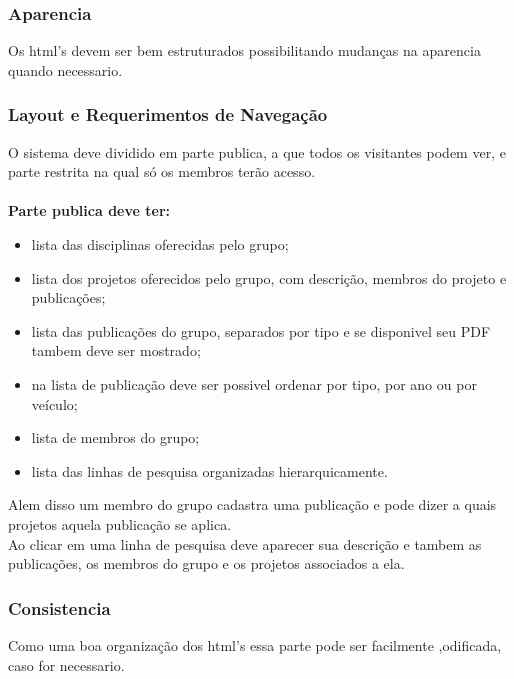 \documentclass[11pt, a4paper]{article}
\begin{document}
			\subsubsection{Aparencia}
				Os html's devem ser bem estruturados possibilitando mudanças 
				na aparencia quando necessario.
				
			\subsubsection{Layout e Requerimentos de Navegação}
				O sistema deve dividido em parte publica, a que todos os 
				visitantes podem ver, e parte restrita na qual só os membros 
				terão acesso.\\
				\\
				\noindent \textbf{Parte publica deve ter:}
				\begin{itemize}
					\item lista das disciplinas oferecidas pelo grupo;
					\item lista dos projetos oferecidos pelo grupo, com 
					descrição, membros do projeto e publicações;
					\item lista das publicações do grupo, separados por tipo e 
					se disponivel seu PDF tambem deve ser mostrado;
					\item na lista de publicação deve ser possivel ordenar por 
					tipo, por ano ou por veículo;
					\item lista de  membros do grupo;
					\item lista das linhas de pesquisa organizadas 
					hierarquicamente.
				\end{itemize}
				
				\indent Alem disso um membro do grupo cadastra uma publicação e
				pode dizer a quais projetos aquela publicação se aplica.\\
				\indent Ao clicar em uma linha de pesquisa deve aparecer sua 
				descrição e tambem as publicações, os membros do grupo e os 
				projetos associados a ela.
							
			\subsubsection{Consistencia}
				Como uma boa organização dos html's essa parte pode ser 
				facilmente ,odificada, caso for necessario.
\end{document}
